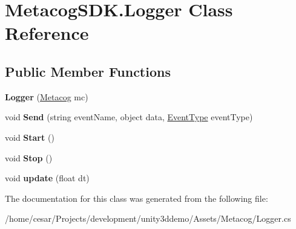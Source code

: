 \hypertarget{classMetacogSDK_1_1Logger}{}\section{Metacog\+S\+D\+K.\+Logger Class Reference}
\label{classMetacogSDK_1_1Logger}
\subsection*{Public Member Functions}
\begin{DoxyCompactItemize}
\item 
{\bfseries Logger} (\hyperlink{classMetacogSDK_1_1Metacog}{Metacog} mc)\hypertarget{classMetacogSDK_1_1Logger_a3e137315344b8a7469d863bfd3495c2c}{}\label{classMetacogSDK_1_1Logger_a3e137315344b8a7469d863bfd3495c2c}

\item 
void {\bfseries Send} (string event\+Name, object data, \hyperlink{namespaceMetacogSDK_a9a46be6b2e98a6ae7460c93faf69728e}{Event\+Type} event\+Type)\hypertarget{classMetacogSDK_1_1Logger_aa3b730166a419e25aa9a5c22a0d68690}{}\label{classMetacogSDK_1_1Logger_aa3b730166a419e25aa9a5c22a0d68690}

\item 
void {\bfseries Start} ()\hypertarget{classMetacogSDK_1_1Logger_a5394b2435a693ba6b7b7745bb6d93129}{}\label{classMetacogSDK_1_1Logger_a5394b2435a693ba6b7b7745bb6d93129}

\item 
void {\bfseries Stop} ()\hypertarget{classMetacogSDK_1_1Logger_a4539588c58009fd4343a83757cf5b84f}{}\label{classMetacogSDK_1_1Logger_a4539588c58009fd4343a83757cf5b84f}

\item 
void {\bfseries update} (float dt)\hypertarget{classMetacogSDK_1_1Logger_a42cbf5df7e9d83ee96010c63eb62d66a}{}\label{classMetacogSDK_1_1Logger_a42cbf5df7e9d83ee96010c63eb62d66a}

\end{DoxyCompactItemize}


The documentation for this class was generated from the following file\+:\begin{DoxyCompactItemize}
\item 
/home/cesar/\+Projects/development/unity3ddemo/\+Assets/\+Metacog/Logger.\+cs\end{DoxyCompactItemize}
